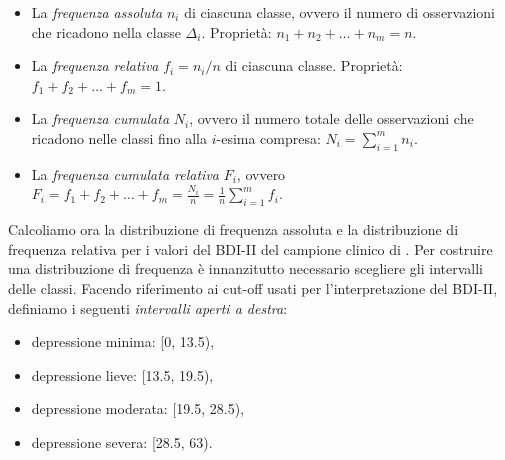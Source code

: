 \documentclass[
  11pt,
  italian,
  a4paper,
  extrafontsizes,onecolumn,openright
  ]{memoir}
\providecommand{\tightlist}{%
  \setlength{\itemsep}{0pt}\setlength{\parskip}{0pt}}
\theoremstyle{definition}
\theoremstyle{definition}
\theoremstyle{definition}
\theoremstyle{definition}
\theoremstyle{remark}
\begin{document}
\begin{itemize}
\item
  La \emph{frequenza assoluta} \(n_i\) di ciascuna classe, ovvero il numero di osservazioni che ricadono nella classe \(\Delta_i\).
  Proprietà: \(n_1 + n_2 + \dots + n_m = n\).
\item
  La \emph{frequenza relativa} \(f_i = n_i/n\) di ciascuna classe. Proprietà: \(f_1+f_2+\dots+f_m =1\).
\item
  La \emph{frequenza cumulata} \(N_i\), ovvero il numero totale delle osservazioni che ricadono nelle classi fino alla \(i\)-esima compresa: \(N_i = \sum_{i=1}^m n_i.\)
\item
  La \emph{frequenza cumulata relativa} \(F_i\), ovvero
  \(F_i = f_1+f_2+\dots+f_m = \frac{N_i}{n} = \frac{1}{n} \sum_{i=1}^m f_i.\)
\end{itemize}

Calcoliamo ora la distribuzione di frequenza assoluta e la distribuzione di frequenza relativa per i valori del BDI-II del campione clinico di \textcite{zetschefuture2019}. Per costruire una distribuzione di frequenza è innanzitutto necessario scegliere gli intervalli delle classi. Facendo riferimento ai cut-off usati per l'interpretazione del BDI-II, definiamo i seguenti \emph{intervalli aperti a destra}:

\begin{itemize}
\tightlist
\item
  depressione minima: {[}0, 13.5),
\item
  depressione lieve: {[}13.5, 19.5),
\item
  depressione moderata: {[}19.5, 28.5),
\item
  depressione severa: {[}28.5, 63).
\end{itemize}
\end{document}
